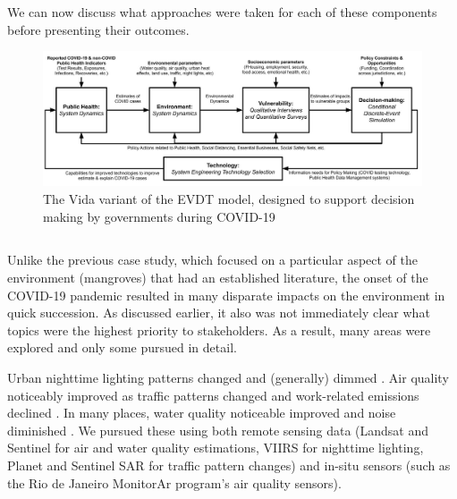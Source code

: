 We can now discuss what approaches were taken for each of these components before presenting their outcomes.

\begin{figure}[H]
	\centering
	\includegraphics[scale=0.25]{Figures/chap5/Vida_Flowchart_v2.jpg}
	\caption[The Vida Variant of the EVDT Model]{The Vida variant of the EVDT model, designed to support decision making by governments during COVID-19}
	\label{fig:vida_flow}
\end{figure}

\subsection{} \label{sec:vida-evdt-method}


\subsubsection{} \label{sec:vida-evdt-e-method}

Unlike the previous case study, which focused on a particular aspect of the environment (mangroves) that had an established literature, the onset of the COVID-19 pandemic resulted in many disparate impacts on the environment in quick succession. As discussed earlier, it also was not immediately clear what topics were the highest priority to stakeholders. As a result, many areas were explored and only some pursued in detail.

Urban nighttime lighting patterns changed and (generally) dimmed \cite{elvidgeDimmingLightsChina2020}. Air quality noticeably improved as traffic patterns changed and work-related emissions declined \cite{isaifanDramaticImpactCoronavirus2020}. In many places, water quality noticeable improved and noise diminished \cite{aroraCoronavirusLockdownHelped2020}. We pursued these using both remote sensing data (Landsat and Sentinel for air and water quality estimations, VIIRS for nighttime lighting, Planet and Sentinel SAR for traffic pattern changes) and in-situ sensors (such as the Rio de Janeiro MonitorAr program's air quality sensors).

